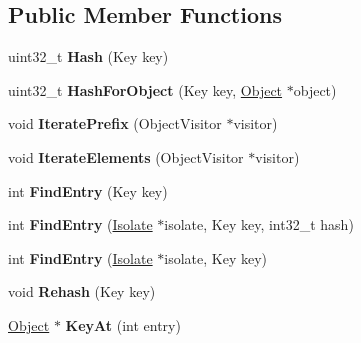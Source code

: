 \subsection*{Public Member Functions}
\begin{DoxyCompactItemize}
\item 
uint32\+\_\+t {\bfseries Hash} (Key key)\hypertarget{classv8_1_1internal_1_1_hash_table_a79040f71245c3d19f0936bdd69028834}{}\label{classv8_1_1internal_1_1_hash_table_a79040f71245c3d19f0936bdd69028834}

\item 
uint32\+\_\+t {\bfseries Hash\+For\+Object} (Key key, \hyperlink{classv8_1_1internal_1_1_object}{Object} $\ast$object)\hypertarget{classv8_1_1internal_1_1_hash_table_a7b871d5478daf0f214436ce99401b5fb}{}\label{classv8_1_1internal_1_1_hash_table_a7b871d5478daf0f214436ce99401b5fb}

\item 
void {\bfseries Iterate\+Prefix} (Object\+Visitor $\ast$visitor)\hypertarget{classv8_1_1internal_1_1_hash_table_a835cf648c19ee8608823136bff338527}{}\label{classv8_1_1internal_1_1_hash_table_a835cf648c19ee8608823136bff338527}

\item 
void {\bfseries Iterate\+Elements} (Object\+Visitor $\ast$visitor)\hypertarget{classv8_1_1internal_1_1_hash_table_ac4d068c9ee95b536a49aa6388d21a97a}{}\label{classv8_1_1internal_1_1_hash_table_ac4d068c9ee95b536a49aa6388d21a97a}

\item 
int {\bfseries Find\+Entry} (Key key)\hypertarget{classv8_1_1internal_1_1_hash_table_aebd11697b3709b8e33c273ccdea46133}{}\label{classv8_1_1internal_1_1_hash_table_aebd11697b3709b8e33c273ccdea46133}

\item 
int {\bfseries Find\+Entry} (\hyperlink{classv8_1_1internal_1_1_isolate}{Isolate} $\ast$isolate, Key key, int32\+\_\+t hash)\hypertarget{classv8_1_1internal_1_1_hash_table_adc5182ebf6e26bc6da3d45b2f9fecb34}{}\label{classv8_1_1internal_1_1_hash_table_adc5182ebf6e26bc6da3d45b2f9fecb34}

\item 
int {\bfseries Find\+Entry} (\hyperlink{classv8_1_1internal_1_1_isolate}{Isolate} $\ast$isolate, Key key)\hypertarget{classv8_1_1internal_1_1_hash_table_aaea324054c41c8f16af82c8281b9096e}{}\label{classv8_1_1internal_1_1_hash_table_aaea324054c41c8f16af82c8281b9096e}

\item 
void {\bfseries Rehash} (Key key)\hypertarget{classv8_1_1internal_1_1_hash_table_a8e2c6cf3cc16c95c4a6a2dd693db186c}{}\label{classv8_1_1internal_1_1_hash_table_a8e2c6cf3cc16c95c4a6a2dd693db186c}

\item 
\hyperlink{classv8_1_1internal_1_1_object}{Object} $\ast$ {\bfseries Key\+At} (int entry)\hypertarget{classv8_1_1internal_1_1_hash_table_a2ed7d2eea2cfcf271002606e9ccf003c}{}\label{classv8_1_1internal_1_1_hash_table_a2ed7d2eea2cfcf271002606e9ccf003c}

\end{DoxyCompactItemize}

